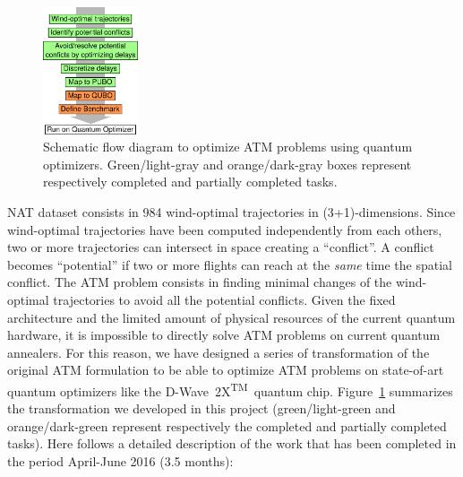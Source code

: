\documentclass[9pt]{extarticle}
\renewcommand{\figurename}{Figure}
\newcommand{\DW}{\mbox{D-Wave 2X\textsuperscript{TM}}~}
\begin{document}
%
\begin{figure}
\centering
\includegraphics[width=0.25\textwidth]{scheme}
\caption{\label{fig:scheme}Schematic flow diagram to optimize ATM problems using quantum optimizers. Green/light-gray and orange/dark-gray boxes represent
respectively completed and partially completed tasks.}
\end{figure}
%
NAT dataset consists in 984 wind-optimal trajectories in (3+1)-dimensions. Since wind-optimal
trajectories have been computed independently from each others, two or more trajectories can intersect in space creating a ``conflict''. 
A conflict becomes ``potential'' if two or more flights can reach at the \emph{same} time the spatial conflict. The ATM problem consists
in finding minimal changes of the wind-optimal trajectories to avoid all the potential conflicts. 
Given the fixed architecture and the limited amount of physical resources of the current quantum hardware, it is impossible to directly solve ATM problems
on current quantum annealers. For this reason, we have designed a series of transformation of the original ATM formulation 
to be able to optimize ATM problems on state-of-art quantum optimizers like the \DW quantum chip. \figurename~\ref{fig:scheme} summarizes the transformation 
we developed in this project (green/light-green and orange/dark-green represent respectively the completed and partially completed tasks).
Here follows a detailed description of the work that has been completed in the period April-June 2016 (3.5 months):
\end{document}
